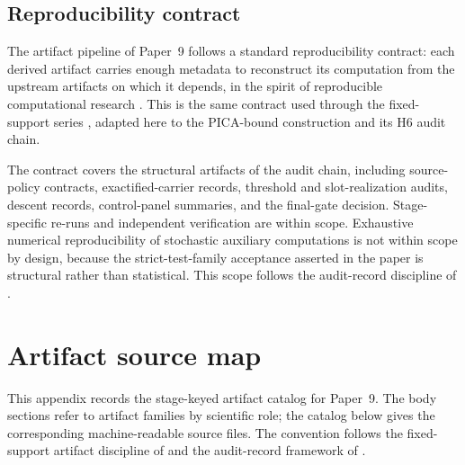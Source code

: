\documentclass[11pt]{article}
\newcommand{\NewLayer}{H6}
\newcommand{\PaperNine}{Paper~9}
\theoremstyle{definition}
\begin{document}
\subsection{Reproducibility contract}\label{subsec:reproducibility-contract}

The artifact pipeline of \PaperNine{} follows a standard reproducibility
contract: each derived artifact carries enough metadata to reconstruct its
computation from the upstream artifacts on which it depends, in the spirit of
reproducible computational research \cite{Donoho2010,Sandve2013}.  This is the
same contract used through the fixed-support series
\cite{Tsiokos2026CarrierToEvent,Tsiokos2026CarrierExactification}, adapted here
to the PICA-bound construction and its \NewLayer{} audit chain.

The contract covers the structural artifacts of the audit chain, including
source-policy contracts, exactified-carrier records, threshold and
slot-realization audits, descent records, control-panel summaries, and the
final-gate decision.  Stage-specific re-runs and independent verification are
within scope.  Exhaustive numerical reproducibility of stochastic auxiliary
computations is not within scope by design, because the strict-test-family
acceptance asserted in the paper is structural rather than statistical.  This
scope follows the audit-record discipline of
\cite{Tsiokos2026FoundationsII}.
 \section{Artifact source map}\label{app:artifact-map}

This appendix records the stage-keyed artifact catalog for \PaperNine{}.  The
body sections refer to artifact families by scientific role; the catalog below
gives the corresponding machine-readable source files.  The convention follows
the fixed-support artifact discipline of
\cite{Tsiokos2026CarrierToEvent,Tsiokos2026CarrierExactification} and the
audit-record framework of \cite{Tsiokos2026FoundationsII}.
\end{document}
